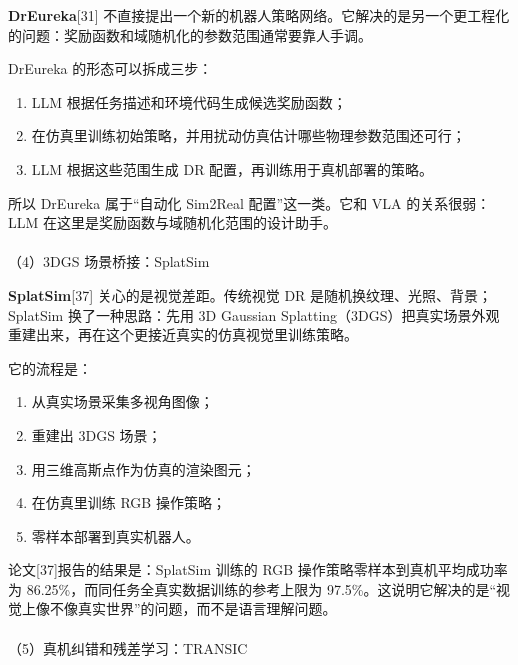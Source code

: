\documentclass[
  chinese,
]{ctexart}
\makeatletter
\let\oldparagraph\paragraph
\renewcommand{\paragraph}{
    \@ifstar
      \xxxParagraphStar
      \xxxParagraphNoStar
  }
\newcommand{\xxxParagraphStar}[1]{\oldparagraph*{#1}\mbox{}}
\newcommand{\xxxParagraphNoStar}[1]{\oldparagraph{#1}\mbox{}}
\providecommand{\tightlist}{%
  \setlength{\itemsep}{0pt}\setlength{\parskip}{0pt}}
\makeatother
\begin{document}
\textbf{DrEureka}{[}31{]}
不直接提出一个新的机器人策略网络。它解决的是另一个更工程化的问题：奖励函数和域随机化的参数范围通常要靠人手调。

DrEureka 的形态可以拆成三步：

\begin{enumerate}
\def\labelenumi{\arabic{enumi}.}
\tightlist
\item
  LLM 根据任务描述和环境代码生成候选奖励函数；
\item
  在仿真里训练初始策略，并用扰动仿真估计哪些物理参数范围还可行；
\item
  LLM 根据这些范围生成 DR 配置，再训练用于真机部署的策略。
\end{enumerate}

所以 DrEureka 属于``自动化 Sim2Real 配置''这一类。它和 VLA
的关系很弱：LLM 在这里是奖励函数与域随机化范围的设计助手。

\paragraph{（4）3DGS
场景桥接：SplatSim}\label{dgs-ux573aux666fux6865ux63a5splatsim}

\textbf{SplatSim}{[}37{]} 关心的是视觉差距。传统视觉 DR
是随机换纹理、光照、背景；SplatSim 换了一种思路：先用 3D Gaussian
Splatting（3DGS）把真实场景外观重建出来，再在这个更接近真实的仿真视觉里训练策略。

它的流程是：

\begin{enumerate}
\def\labelenumi{\arabic{enumi}.}
\tightlist
\item
  从真实场景采集多视角图像；
\item
  重建出 3DGS 场景；
\item
  用三维高斯点作为仿真的渲染图元；
\item
  在仿真里训练 RGB 操作策略；
\item
  零样本部署到真实机器人。
\end{enumerate}

论文{[}37{]}报告的结果是：SplatSim 训练的 RGB
操作策略零样本到真机平均成功率为
86.25\%，而同任务全真实数据训练的参考上限为
97.5\%。这说明它解决的是``视觉上像不像真实世界''的问题，而不是语言理解问题。

\paragraph{（5）真机纠错和残差学习：TRANSIC}\label{ux771fux673aux7ea0ux9519ux548cux6b8bux5deeux5b66ux4e60transic}
\end{document}
